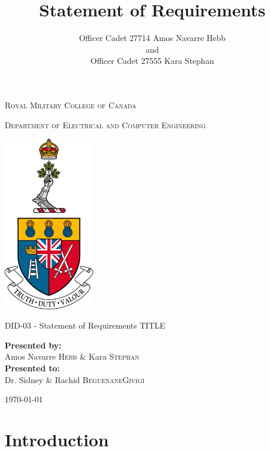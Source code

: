 \documentclass{article}
\title{Statement of Requirements}
\author{Officer Cadet 27714 Amos Navarre Hebb\\and\\Officer Cadet 27555 Kara Stephan}
\begin{document}
	
\begin{titlepage}
	\begin{center}
		\vspace*{1cm}
		
		\LARGE\textsc{Royal Military College of Canada}\normalsize
		
		\vspace{0.2cm}
		
		\textsc{Department of Electrical and Computer Engineering}
		
		\vspace{1.5cm}
		
		\includegraphics[width=0.3\textwidth]{rmcLogo.png}
		
		\vspace{1.5cm}
		
		\LARGE{DID-03 - Statement of Requirements TITLE}\normalsize
		
		\vfill
		
		\textbf{Presented by:}\\Amos Navarre \textsc{Hebb} \& Kara \textsc{Stephan}\\
		\vspace{0.8cm}
		\textbf{Presented to:}\\Dr. Sidney \& Rachid \textsc{Beguenane}\textsc{Givigi}
		\vspace{0.8cm}
		
		\today
		
	\end{center}
\end{titlepage}


\tableofcontents
\newpage

\section{Introduction}
\end{document}
